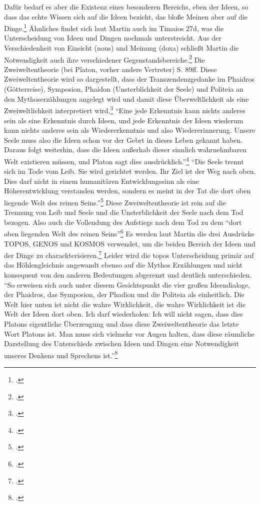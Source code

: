 {
Dafür bedarf es aber die Existenz eines besonderen Bereichs, eben der Ideen, so dass das echte Wissen sich auf die Ideen bezieht, das bloße Meinen aber auf die Dinge.\footcite[vgl.][S. 51]{Martin73}
Ähnliches findet sich laut Martin auch im Timaios 27d, was die Unterscheidung von Ideen und Dingen nochmals unterstreicht.
Aus der Verschiedenheit von Einsicht (nous) und Meinung (doxa) schließt Martin die Notwendigkeit auch ihre verschiedener Gegenstandsbereiche.\footcite[vgl.][S. 52]{Martin73}}
Die Zweiweltentheorie (bei Platon, vorher andere Vertreter) S. 89ff.
Diese Zweiweltentheorie wird so dargestellt, dass der Transzendenzgedanke im Phaidros (Götterreise), Symposion, Phaidon (Unsterblichkeit der Seele) und Politeia an den Mythoserzählungen angelegt wird und damit diese Überweltlichkeit als eine Zweiweltlichkeit interpretiert wird.\footcite[vgl.][S. 88ff.]{Martin73}
\enquote{Eine jede Erkenntnis kann nichts anderes sein als eine Erkenntnis durch Ideen, und jede Erkenntnis der Ideen wiederum kann nichts anderes sein als Wiedererkenntnis und also Wiedererinnerung. Unsere Seele muss also die Ideen schon vor der Gebrt in dieses Leben gekannt haben. Daraus folgt weiterhin, dass die Ideen außerhab dieser sinnlich wahrnehmbaren Welt existieren müssen, und Platon sagt dies ausdrücklich.}\footcite[][S. 92]{Martin73}
\enquote{Die Seele trennt sich im Tode vom Leib. Sie wird gerichtet werden. Ihr Ziel ist der Weg nach oben. Dies darf nicht in einem humanitären Entwicklungssinn als eine Höherentwicklung verstanden werden, sondern es meint in der Tat die dort oben liegende Welt des reinen Seins.}\footcite[][S. 93]{Martin73}
Diese Zweiweltentheorie ist rein auf die Trennung von Leib und Seele und die Unsterblichkeit der Seele nach dem Tod bezogen. Also auch die Vollendung des Aufstiegs nach dem Tod zu dem \enquote{dort oben liegenden Welt des reinen Seins}\footcite[][S. 93]{Martin73}
Es werden laut Martin die drei Ausdrücke TOPOS, GENOS und KOSMOS verwendet, um die beiden Bereich der Ideen und der Dinge zu charackterisieren.\footcite[vgl.][S. 95]{Martin73}
Leider wird die topos Unterscheidung primär auf das Höhlengleichnis angewandt ebenso auf die Mythos Erzählungen und nicht konsequent von den anderen Bedeutungen abgerenzt und deutlich unterschieden.
\enquote{So erweisen sich auch unter diesem Gesichtspunkt die vier großen Ideendialoge, der Phaidros, das Symposion, der Phadion und die Politeia als einheitlich. Die Welt hier unten ist nicht die wahre Wirklichkeit, die wahre Wirklichkeit ist die Welt der Ideen dort oben. Ich darf wiederholen: Ich will nicht sagen, dass dies Platons eigentliche Überzeugung und dass diese Zweiweltentheorie das letzte Wort Platons ist. Man muss sich vielmehr vor Augen halten, dass diese räumliche Darstellung des Unterschieds zwischen Ideen und Dingen eine Notwendigkeit unseres Denkens und Sprechens ist.}\footcite[][S. 96]{Martin73}
